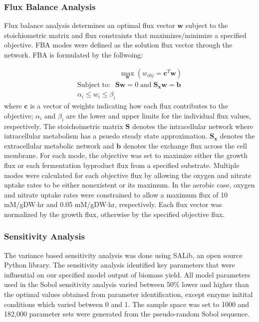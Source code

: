 \documentclass[10pt,twocolumn,twoside,final]{IEEEtran}
\begin{document}
\subsubsection*{Flux Balance Analysis}
Flux balance analysis determines an optimal flux vector $\mathbf{w}$ subject to the stoichiometric matrix and flux constraints that maximizes/minimize a specified objective.
FBA modes were defined as the solution flux vector through the network.
FBA is formulated by the follwoing:

\begin{equation}
 \begin{multlined}
	\qquad \qquad \qquad \max_{\boldsymbol{w}}{} \! \left( w_{obj} = \boldsymbol{c}^T \boldsymbol{w} \right) \\
	\mathrm{Subject \; to:}
	 \; \; \mathbf{S}\mathbf{w}=0 \mathrm{\; and \;} \mathbf{S_{x}}\mathbf{w} = \mathbf{b} \\
\alpha_i \leq w_i \leq \beta_i  \qquad
 \end{multlined}
\end{equation}
where $\boldsymbol{c}$ is a vector of weights indicating how each flux contributes to the objective; $\alpha_i$ and $\beta_i$ are the lower and upper limits for the individual flux values, respectively.
The stoichoimetric matrix $\mathbf{S}$ denotes the intracellular network where intracellular metabolism has a psuedo steady state approximation.
$\mathbf{S_{x}}$ denotes the extracellular metabolic network and $\mathbf{b}$ denotes the exchange flux across the cell membrane.
For each mode, the objective was set to maximize either the growth flux or each fermentation byproduct flux from a specified substrate.
Multiple modes were calculated for each objective flux by allowing the oxygen and nitrate uptake rates to be either nonexistent or its maximum.
In the aerobic case, oxygen and nitrate uptake rates were constrained to allow a maximum flux of 10 mM/gDW$\cdot$hr and 0.05 mM/gDW$\cdot$hr, respectively.
Each flux vector was normalized by the growth flux, otherwise by the specified objective flux.

\subsubsection*{Sensitivity Analysis}
The variance based sensitivity analysis\cite{2010_saltelli} was done using SALib, an open source Python library. The sensitivity analysis identified key parameters that were influential on our specified model output of biomass yield. All model parameters used in the Sobol sensitivity analysis varied between 50\% lower and higher than the optimal values obtained from parameter identification, except enzyme initital conditions which varied between 0 and 1. The sample space was set to 1000 and 182,000 parameter sets were generated from the pseudo-random Sobol sequence.
\end{document}
